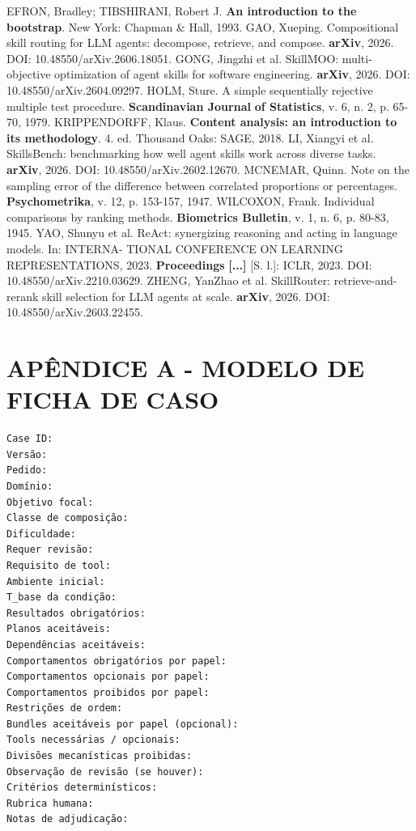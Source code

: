 \documentclass[12pt,a4paper]{article}
\begin{document}

EFRON, Bradley; TIBSHIRANI, Robert J.\textbf{ An introduction to the bootstrap}. New York: Chapman \& Hall, 1993. GAO, Xueping. Compositional skill routing for LLM agents: decompose, retrieve, and compose. \textbf{arXiv}, 2026. DOI: 10.48550/arXiv.2606.18051. GONG, Jingzhi et al. SkillMOO: multi-objective optimization of agent skills for software engineering.\textbf{ arXiv}, 2026. DOI: 10.48550/arXiv.2604.09297. HOLM, Sture. A simple sequentially rejective multiple test procedure.\textbf{ Scandinavian Journal} \textbf{of Statistics}, v. 6, n. 2, p. 65-70, 1979. KRIPPENDORFF, Klaus.\textbf{ Content analysis: an introduction to its methodology}. 4. ed. Thousand Oaks: SAGE, 2018. LI, Xiangyi et al. SkillsBench: benchmarking how well agent skills work across diverse tasks. \textbf{arXiv}, 2026. DOI: 10.48550/arXiv.2602.12670. MCNEMAR, Quinn. Note on the sampling error of the difference between correlated proportions or percentages.\textbf{ Psychometrika}, v. 12, p. 153-157, 1947. WILCOXON, Frank. Individual comparisons by ranking methods.\textbf{ Biometrics Bulletin}, v. 1, n. 6, p. 80-83, 1945. YAO, Shunyu et al. ReAct: synergizing reasoning and acting in language models. In: INTERNA- TIONAL CONFERENCE ON LEARNING REPRESENTATIONS, 2023.\textbf{ Proceedings} \textbf{[...]} [S. l.]: ICLR, 2023. DOI: 10.48550/arXiv.2210.03629. ZHENG, YanZhao et al. SkillRouter: retrieve-and-rerank skill selection for LLM agents at scale. \textbf{arXiv}, 2026. DOI: 10.48550/arXiv.2603.22455.



\section*{APÊNDICE A - MODELO DE FICHA DE CASO}

\begin{Verbatim}[breaklines=true,breakanywhere=true,fontsize=\small]
Case ID:
Versão:
Pedido:
Domínio:
Objetivo focal:
Classe de composição:
Dificuldade:
Requer revisão:
Requisito de tool:
Ambiente inicial:
T_base da condição:
Resultados obrigatórios:
Planos aceitáveis:
Dependências aceitáveis:
Comportamentos obrigatórios por papel:
Comportamentos opcionais por papel:
Comportamentos proibidos por papel:
Restrições de ordem:
Bundles aceitáveis por papel (opcional):
Tools necessárias / opcionais:
Divisões mecanísticas proibidas:
Observação de revisão (se houver):
Critérios determinísticos:
Rubrica humana:
Notas de adjudicação:
\end{Verbatim}
\end{document}
